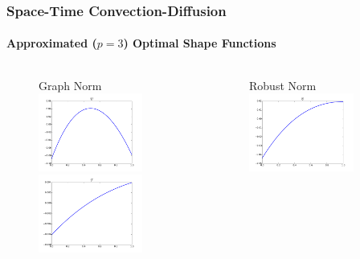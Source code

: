 \documentclass[18pt,xcolor=table]{beamer}
\begin{document}
\begin{frame}[t]
\frametitle{Space-Time Convection-Diffusion}
\framesubtitle{Approximated ($p=3$) Optimal Shape Functions}
\vspace{-3ex}
\begin{columns}
\begin{column}{0.5\textwidth}
\begin{figure}[t]
\centering
Graph Norm
\includegraphics[width=0.8\textwidth]{OptimalTestFunctions/GraphApprox3_v}\\
\includegraphics[width=0.8\textwidth]{OptimalTestFunctions/GraphApprox3_tau}
\end{figure}
\end{column}
\begin{column}{0.5\textwidth}
\begin{figure}[t]
\centering
Robust Norm
\includegraphics[width=0.8\textwidth]{OptimalTestFunctions/RobustApprox3_v}\\

\end{figure}
\end{column}
\end{columns}
\end{frame}
\end{document}
